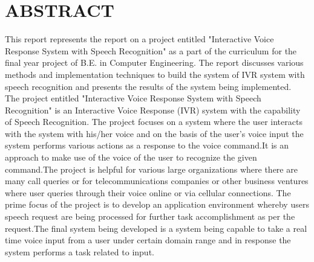 
\newpage
{} {}

\section*{ABSTRACT}


This report represents the report on a project entitled "Interactive Voice Response System with Speech Recognition" as a part of the curriculum for the final year project of B.E. in Computer Engineering. The report discusses various methods and implementation techniques to build the system of IVR system with speech recognition and presents the results of the system being implemented. \\
The project entitled "Interactive Voice Response System with Speech Recognition" is an Interactive Voice Response (IVR) system with the capability of Speech Recognition. The project focuses on a system where the user interacts with the system with his/her voice and on the basis of the user's voice input the system performs various actions as a response to the voice command.It is an approach to make use of the voice of the user to recognize the given command.The project is helpful for various large organizations where there are many call queries or for telecommunications companies or other business ventures where user queries through their voice online or via cellular connections.  The prime focus of the project is to develop an application environment whereby users speech request are being processed for further task accomplishment as per the request.The final system being developed is a system being capable to take a real time voice input from a user under certain domain range and in response the system performs a task related to input.


